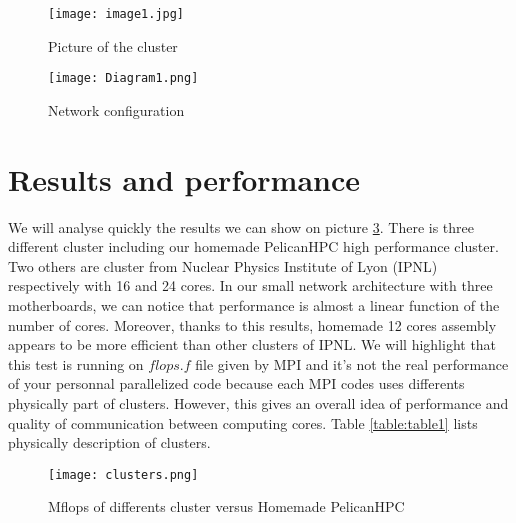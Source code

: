 \documentclass[11pt,a4paper]{article}
\begin{document}
\begin{figure}[!htb]
\centering
\texttt{[image: image1.jpg]}
\caption{Picture of the cluster}
\label{fig:Figure1}
\end{figure}

\begin{figure}[!htb]
\centering
\texttt{[image: Diagram1.png]}
\caption{Network configuration}
\label{fig:Figure2}
\end{figure}

\section{Results and performance}
\noindent
We will analyse quickly the results we can show on picture \ref{fig:Figure3}. There is three different cluster including our homemade PelicanHPC high performance cluster. Two others are cluster from Nuclear Physics Institute of Lyon (IPNL) respectively with 16 and 24 cores. In our small network architecture with three motherboards, we can notice that performance is almost a linear function of the number of cores. Moreover, thanks to this results, homemade 12 cores assembly appears to be more efficient than other clusters of IPNL. We will highlight that this test is running on $flops.f$ file given by MPI and it's not the real performance of your personnal parallelized code because each MPI codes uses differents physically part of clusters. However, this gives an overall idea of performance and quality of communication between computing cores. Table \ref{table:table1} lists physically description of clusters.

\begin{figure}[!htb]
\centering
\texttt{[image: clusters.png]}
\caption{Mflops of differents cluster versus Homemade PelicanHPC}
\label{fig:Figure3}
\end{figure}
\end{document}
